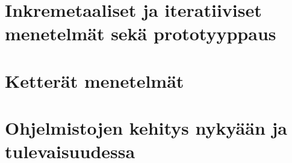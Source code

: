 \documentclass[finnish,12pt]{tktltiki2}
\theoremstyle{definition}
\theoremstyle{remark}
\begin{document}
\section{Inkremetaaliset ja iteratiiviset menetelmät sekä prototyyppaus}
\section{Ketterät menetelmät}
\section{Ohjelmistojen kehitys nykyään ja tulevaisuudessa}

%
%
% 
%







% 
\end{document}
